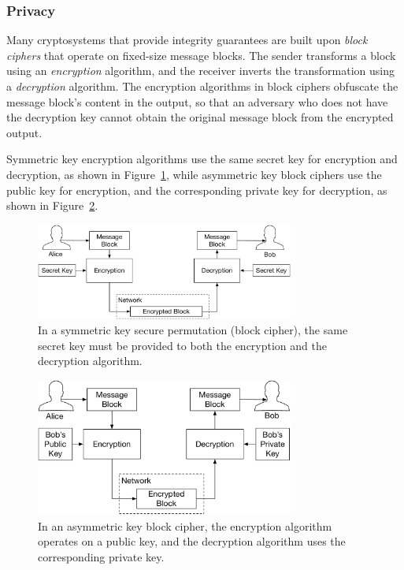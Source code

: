 \subsubsection{Privacy}

Many cryptosystems that provide integrity guarantees are built upon
\textit{block ciphers} that operate on fixed-size message blocks. The sender
transforms a block using an \textit{encryption} algorithm, and the receiver
inverts the transformation using a \textit{decryption} algorithm. The
encryption algorithms in block ciphers obfuscate the message block's content in
the output, so that an adversary who does not have the decryption key cannot
obtain the original message block from the encrypted output.

Symmetric key encryption algorithms use the same secret key for encryption and
decryption, as shown in Figure~\ref{fig:symmetric_block_cipher}, while
asymmetric key block ciphers use the public key for encryption, and the
corresponding private key for decryption, as shown in
Figure~\ref{fig:asymmetric_block_cipher}.
\begin{figure}[hbt]
  \centering
  \includegraphics[width=85mm]{figures/symmetric_block_cipher.pdf}
  \caption{
    In a symmetric key secure permutation (block cipher), the same secret key
    must be provided to both the encryption and the decryption algorithm.
  }
  \label{fig:symmetric_block_cipher}
\end{figure}

\begin{figure}[hbt]
  \centering
  \includegraphics[width=85mm]{figures/asymmetric_block_cipher.pdf}
  \caption{
    In an asymmetric key block cipher, the encryption algorithm operates on a
    public key, and the decryption algorithm uses the corresponding private
    key.
  }
  \label{fig:asymmetric_block_cipher}
\end{figure}

